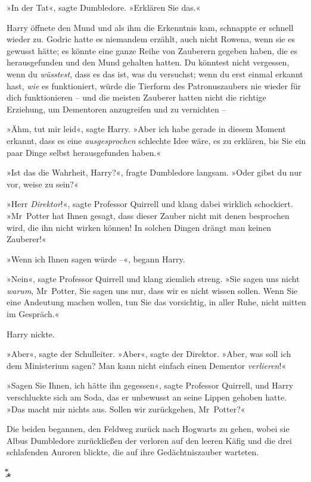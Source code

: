 {»In der Tat«, sagte Dumbledore. »Erklären Sie das.«

Harry öffnete den Mund und als ihm die Erkenntnis kam, schnappte er schnell wieder zu. Godric hatte es niemandem erzählt, auch nicht Rowena, wenn sie es gewusst hätte; es könnte eine ganze Reihe von Zauberern gegeben haben, die es herausgefunden und den Mund gehalten hatten. Du könntest nicht vergessen, wenn du \emph{wüsstest}, dass es das ist, was du versuchst; wenn du erst einmal erkannt hast, \emph{wie} es funktioniert, würde die Tierform des Patronuszaubers nie wieder für dich funktionieren -- und die meisten Zauberer hatten nicht die richtige Erziehung, um Dementoren anzugreifen und zu vernichten --

»Ähm, tut mir leid«, sagte Harry. »Aber ich habe gerade in diesem Moment erkannt, dass es eine \emph{ausgesprochen} schlechte Idee wäre, es zu erklären, bis Sie ein paar Dinge selbst herausgefunden haben.«

»Ist das die Wahrheit, Harry?«, fragte Dumbledore langsam. »Oder gibst du nur vor, weise zu sein?«

»Herr \emph{Direktor}!«, sagte Professor Quirrell und klang dabei wirklich schockiert. »Mr~Potter hat Ihnen gesagt, dass dieser Zauber nicht mit denen besprochen wird, die ihn nicht wirken können! In solchen Dingen drängt man keinen Zauberer!«

»Wenn ich Ihnen sagen würde --«, begann Harry.

»Nein«, sagte Professor Quirrell und klang ziemlich streng. »Sie sagen uns nicht \emph{warum}, Mr~Potter, Sie sagen uns nur, dass wir es nicht wissen sollen. Wenn Sie eine Andeutung machen wollen, tun Sie das vorsichtig, in aller Ruhe, nicht mitten im Gespräch.«

Harry nickte.

»Aber«, sagte der Schulleiter. »Aber«, sagte der Direktor. »Aber, was soll ich dem Ministerium sagen? Man kann nicht einfach einen Dementor \emph{verlieren}!«

»Sagen Sie Ihnen, ich hätte ihn gegessen«, sagte Professor Quirrell, und Harry verschluckte sich am Soda, das er unbewusst an seine Lippen gehoben hatte. »Das macht mir nichts aus. Sollen wir zurückgehen, Mr~Potter?«

Die beiden begannen, den Feldweg zurück nach Hogwarts zu gehen, wobei sie Albus Dumbledore zurückließen der verloren auf den leeren Käfig und die drei schlafenden Auroren blickte, die auf ihre Gedächtniszauber warteten.

͙⃰⁎

}
